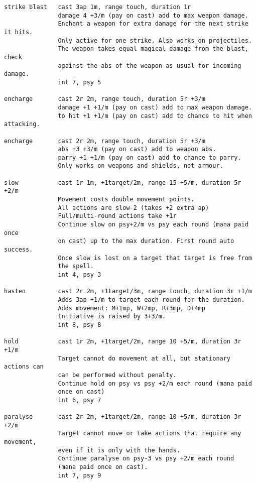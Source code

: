 \begin{verbatim}
strike blast   cast 3ap 1m, range touch, duration 1r
               damage 4 +3/m (pay on cast) add to max weapon damage.
               Enchant a weapon for extra damage for the next strike it hits.
               Only active for one strike. Also works on projectiles.
               The weapon takes equal magical damage from the blast, check
               against the abs of the weapon as usual for incoming damage.
               int 7, psy 5

encharge       cast 2r 2m, range touch, duration 5r +3/m
               damage +1 +1/m (pay on cast) add to max weapon damage.
               to hit +1 +1/m (pay on cast) add to chance to hit when attacking.

encharge       cast 2r 2m, range touch, duration 5r +3/m
               abs +3 +3/m (pay on cast) add to weapon abs.
               parry +1 +1/m (pay on cast) add to chance to parry.
               Only works on weapons and shields, not armour.

slow           cast 1r 1m, +1target/2m, range 15 +5/m, duration 5r +2/m
               Movement costs double movement points.
               All actions are slow-2 (takes +2 extra ap)
               Full/multi-round actions take +1r
               Continue slow on psy+2/m vs psy each round (mana paid once
               on cast) up to the max duration. First round auto success.
               Once slow is lost on a target that target is free from
               the spell.
               int 4, psy 3

hasten         cast 2r 2m, +1target/3m, range touch, duration 3r +1/m
               Adds 3ap +1/m to target each round for the duration.
               Adds movement: M+1mp, W+2mp, R+3mp, D+4mp
               Initiative is raised by 3+3/m.
               int 8, psy 8

hold           cast 1r 2m, +1target/2m, range 10 +5/m, duration 3r +1/m
               Target cannot do movement at all, but stationary actions can
               can be performed without penalty.
               Continue hold on psy vs psy +2/m each round (mana paid
               once on cast)
               int 6, psy 7

paralyse       cast 2r 2m, +1target/2m, range 10 +5/m, duration 3r +2/m
               Target cannot move or take actions that require any movement,
               even if it is only with the hands.
               Continue paralyse on psy-3 vs psy +2/m each round
               (mana paid once on cast).
               int 7, psy 9


\end{verbatim}
